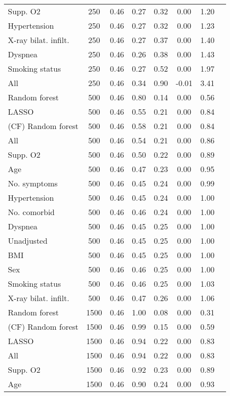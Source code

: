 \documentclass{article}
\begin{document}
{\begin{longtable}{lccccccc}
Supp. O2 & 250 & 0.46 & 0.27 & 0.32 &  0.00 & 1.20 \\ 
Hypertension & 250 & 0.46 & 0.27 & 0.32 &  0.00 & 1.23 \\ 
X-ray bilat. infilt. & 250 & 0.46 & 0.27 & 0.37 &  0.00 & 1.40 \\ 
Dyspnea & 250 & 0.46 & 0.26 & 0.38 &  0.00 & 1.43 \\ 
Smoking status & 250 & 0.46 & 0.27 & 0.52 &  0.00 & 1.97 \\ 
All & 250 & 0.46 & 0.34 & 0.90 & -0.01 & 3.41 \\ \midrule() 
Random forest & 500 & 0.46 & 0.80 & 0.14 &  0.00 & 0.56 \\ 
LASSO & 500 & 0.46 & 0.55 & 0.21 &  0.00 & 0.84 \\ 
(CF) Random forest & 500 & 0.46 & 0.58 & 0.21 &  0.00 & 0.84 \\ 
All & 500 & 0.46 & 0.54 & 0.21 &  0.00 & 0.86 \\ 
Supp. O2 & 500 & 0.46 & 0.50 & 0.22 &  0.00 & 0.89 \\ 
Age & 500 & 0.46 & 0.47 & 0.23 &  0.00 & 0.95 \\ 
No. symptoms & 500 & 0.46 & 0.45 & 0.24 &  0.00 & 0.99 \\ 
Hypertension & 500 & 0.46 & 0.45 & 0.24 &  0.00 & 1.00 \\ 
No. comorbid & 500 & 0.46 & 0.46 & 0.24 &  0.00 & 1.00 \\ 
Dyspnea & 500 & 0.46 & 0.45 & 0.25 &  0.00 & 1.00 \\ 
Unadjusted & 500 & 0.46 & 0.45 & 0.25 &  0.00 & 1.00 \\ 
BMI & 500 & 0.46 & 0.45 & 0.25 &  0.00 & 1.00 \\ 
Sex & 500 & 0.46 & 0.46 & 0.25 &  0.00 & 1.00 \\ 
Smoking status & 500 & 0.46 & 0.46 & 0.25 &  0.00 & 1.03 \\ 
X-ray bilat. infilt. & 500 & 0.46 & 0.47 & 0.26 &  0.00 & 1.06 \\ \midrule() 
Random forest & 1500 & 0.46 & 1.00 & 0.08 &  0.00 & 0.31 \\ 
(CF) Random forest & 1500 & 0.46 & 0.99 & 0.15 &  0.00 & 0.59 \\ 
LASSO & 1500 & 0.46 & 0.94 & 0.22 &  0.00 & 0.83 \\ 
All & 1500 & 0.46 & 0.94 & 0.22 &  0.00 & 0.83 \\ 
Supp. O2 & 1500 & 0.46 & 0.92 & 0.23 &  0.00 & 0.89 \\ 
Age & 1500 & 0.46 & 0.90 & 0.24 &  0.00 & 0.93 \\ 

\end{longtable}}
\end{document}
